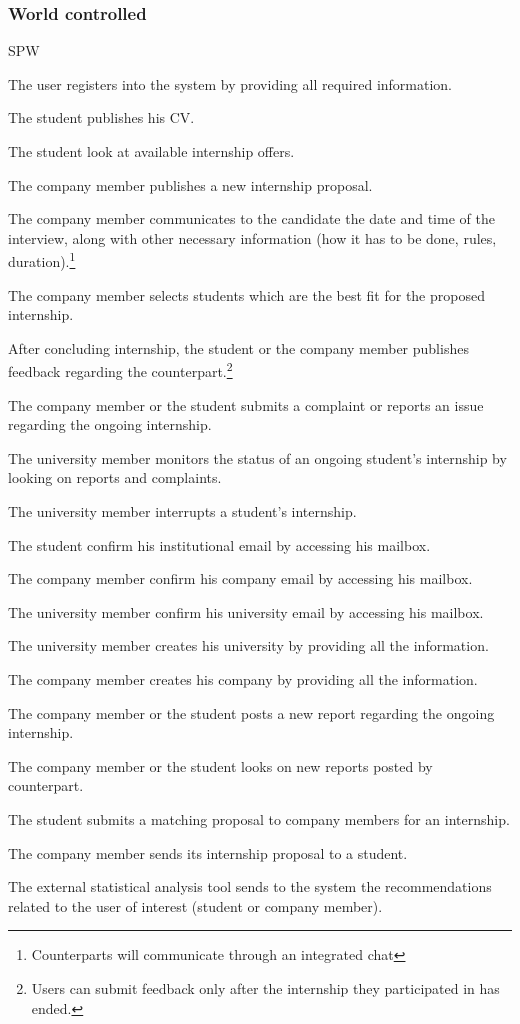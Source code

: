 \subsubsection*{World controlled}
\begin{listInSquareBrackets}{SPW}
    \item The user registers into the system by providing all required information.
    \item The student publishes his CV.
    \item The student look at available internship offers.
    \item The company member publishes a new internship proposal.
    \item The company member communicates to the candidate the date and time of the interview, along with other necessary information (how it has to be done, rules, duration).\footnote{Counterparts will communicate through an integrated chat}
    \item The company member selects students which are the best fit for the proposed internship.
    \item After concluding internship, the student or the company member publishes feedback regarding the counterpart.\footnote{Users can submit feedback only after the internship they participated in has ended.}
    \item The company member or the student submits a complaint or reports an issue regarding the ongoing internship.
    \item The university member monitors the status of an ongoing student's internship by looking on reports and complaints.
    \item The university member interrupts a student's internship.
    \item The student confirm his institutional email by accessing his mailbox.
    \item The company member confirm his company email by accessing his mailbox.
    \item The university member confirm his university email by accessing his mailbox.
    \item The university member creates his university by providing all the information.
    \item The company member creates his company by providing all the information.
    \item The company member or the student posts a new report regarding the ongoing internship.
    \item The company member or the student looks on new reports posted by counterpart.
    \item The student submits a matching proposal to company members for an internship.
    \item The company member sends its internship proposal to a student.
    \item The external statistical analysis tool sends to the system the recommendations related to the user of interest (student or company member).
\end{listInSquareBrackets}
